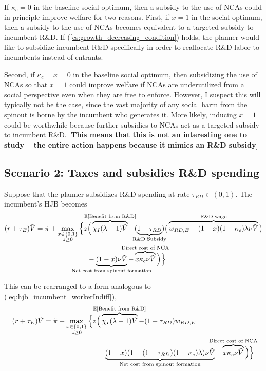 \documentclass[11pt,english]{article}
\theoremstyle{remark}
\begin{document}
If $\kappa_c = 0$ in the baseline social optimum, then a subsidy to the use of NCAs could in principle improve welfare for two reasons. First, if $x = 1$ in the social optimum, then a subsidy to the use of NCAs becomes equivalent to a targeted subsidy to incumbent R\&D. If (\ref{cs:growth_decreasing_condition}) holds, the planner would like to subsidize incumbent R\&D specifically in order to reallocate R\&D labor to incumbents instead of entrants. 

Second, if $\kappa_c = x = 0$ in the baseline social optimum, then subsidizing the use of NCAs so that $x = 1$ could improve welfare if NCAs are underutilized from a social perspective even when they are free to enforce. However, I suspect this will typically not be the case, since the vast majority of any social harm from the spinout is borne by the incumbent who generates it. More likely, inducing $x = 1$ could be worthwhile because further subsidies to NCAs act as a targeted subsidy to incumbent R\&D. [\textbf{This means that this is not an interesting one to study -- the entire action happens because it mimics an R\&D subsidy}]

\subsection{Scenario 2: Taxes and subsidies R\&D spending}

Suppose that the planner subsidizes R\&D spending at rate $\tau_{RD} \in (0,1)$. The incumbent's HJB becomes
\begin{align}
	(r + \tau_E) \tilde{V} = \tilde{\pi} + \max_{\substack{x \in \{0,1\} \\ z \ge 0}} \Big\{z &\Big( \overbrace{\chi_I (\lambda - 1) \tilde{V}}^{\mathclap{\mathbb{E}[\textrm{Benefit from R\&D}]}}- (\underbrace{1-\tau_{RD}}_{\mathclap{\text{R\&D Subsidy}}}) \big( \overbrace{w_{RD,E} - (1-x)(1-\kappa_e)\lambda \nu \tilde{V}}^{\mathclap{\text{R\&D wage}}}\big) \label{eq:hjb_incumbent_RDsubsidy} \nonumber \\ 
	&-  \underbrace{(1-x) \nu \tilde{V}}_{\mathclap{\text{Net cost from spinout formation}}} - \overbrace{x \kappa_{c} \nu \tilde{V}}^{\mathclap{\text{Direct cost of NCA}}}\Big) \Big\} 
\end{align}

This can be rearranged to a form analogous to (\ref{eq:hjb_incumbent_workerIndiff}),
\begin{align}
	(r + \tau_E) \tilde{V} = \tilde{\pi} + \max_{\substack{x \in \{0,1\} \\ z \ge 0}} \Big\{z &\Big( \overbrace{\chi_I (\lambda - 1) \tilde{V}}^{\mathclap{\mathbb{E}[\textrm{Benefit from R\&D}]}}- (1-\tau_{RD}) w_{RD,E} \\
	&-  \underbrace{(1-x)(1 - (1-\tau_{RD})(1-\kappa_{e})\lambda)\nu \tilde{V}}_{\mathclap{\text{Net cost from spinout formation}}} - \overbrace{x \kappa_{c} \nu \tilde{V}}^{\mathclap{\text{Direct cost of NCA}}}\Big) \Big\} \label{eq:hjb_incumbent_RDsubsidy_2}
\end{align}
\end{document}
